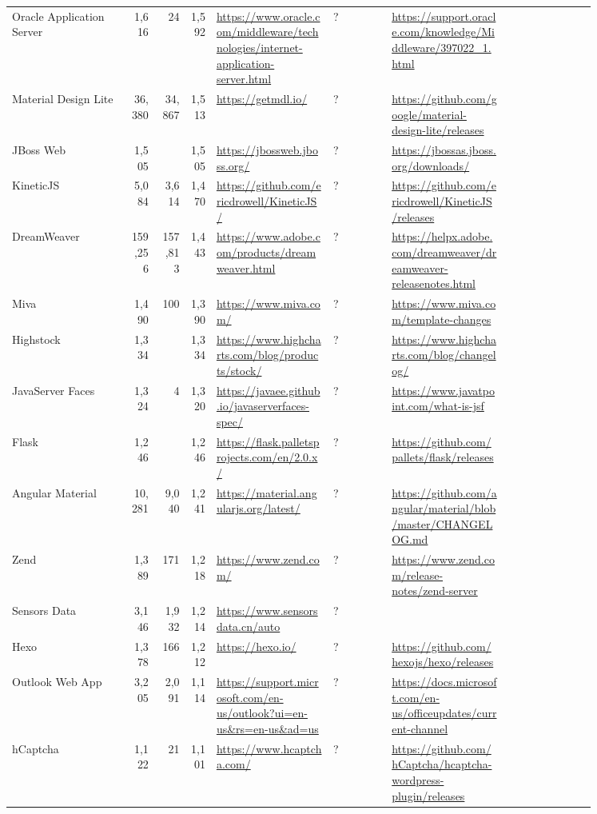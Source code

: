 \begin{longtable}{|p{0.2\linewidth}|r|r|r|p{0.2\linewidth}|p{0.1\linewidth}|p{0.2\linewidth}|p{0.15\linewidth}|}
	Oracle Application Server &1,616 &24 &1,592 &\url{https://www.oracle.com/middleware/technologies/internet-application-server.html} &? &\url{https://support.oracle.com/knowledge/Middleware/397022\_1.html} \\
	Material Design Lite &36,380 &34,867 &1,513 &\url{https://getmdl.io/} &? &\url{https://github.com/google/material-design-lite/releases} \\
	JBoss Web &1,505 & &1,505 &\url{https://jbossweb.jboss.org/} &? &\url{https://jbossas.jboss.org/downloads/} \\
	KineticJS &5,084 &3,614 &1,470 &\url{https://github.com/ericdrowell/KineticJS/} &? &\url{https://github.com/ericdrowell/KineticJS/releases} \\
	DreamWeaver &159,256 &157,813 &1,443 &\url{https://www.adobe.com/products/dreamweaver.html} &? &\url{https://helpx.adobe.com/dreamweaver/dreamweaver-releasenotes.html} \\
	Miva &1,490 &100 &1,390 &\url{https://www.miva.com/} &? &\url{https://www.miva.com/template-changes} \\
	Highstock &1,334 & &1,334 &\url{https://www.highcharts.com/blog/products/stock/} &? &\url{https://www.highcharts.com/blog/changelog/} \\
	JavaServer Faces &1,324 &4 &1,320 &\url{https://javaee.github.io/javaserverfaces-spec/} &? &\url{https://www.javatpoint.com/what-is-jsf} \\
	Flask &1,246 & &1,246 &\url{https://flask.palletsprojects.com/en/2.0.x/} &? &\url{https://github.com/pallets/flask/releases} \\
	Angular Material &10,281 &9,040 &1,241 &\url{https://material.angularjs.org/latest/} &? &\url{https://github.com/angular/material/blob/master/CHANGELOG.md} \\
	Zend &1,389 &171 &1,218 &\url{https://www.zend.com/} &? &\url{https://www.zend.com/release-notes/zend-server} \\
	Sensors Data &3,146 &1,932 &1,214 &\url{https://www.sensorsdata.cn/auto} &? & \\
	Hexo &1,378 &166 &1,212 &\url{https://hexo.io/} &? &\url{https://github.com/hexojs/hexo/releases} \\
	Outlook Web App &3,205 &2,091 &1,114 &\url{https://support.microsoft.com/en-us/outlook?ui=en-us&rs=en-us&ad=us} &? &\url{https://docs.microsoft.com/en-us/officeupdates/current-channel} \\
	hCaptcha &1,122 &21 &1,101 &\url{https://www.hcaptcha.com/} &? &\url{https://github.com/hCaptcha/hcaptcha-wordpress-plugin/releases} \\

\end{longtable}
